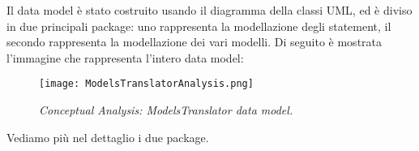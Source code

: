 
Il data model è stato costruito usando il diagramma della classi UML, ed è diviso in due principali package: uno rappresenta la modellazione degli statement, il secondo rappresenta la modellazione dei vari modelli. Di seguito è mostrata l'immagine che rappresenta l'intero data model:
\begin{figure}[H]
	\centering
	\texttt{[image: ModelsTranslatorAnalysis.png]}
	\caption{\small{\textit{Conceptual Analysis: ModelsTranslator data model.}}}
	\label{fig:analysis-data-model}
\end{figure}
Vediamo più nel dettaglio i due package.

